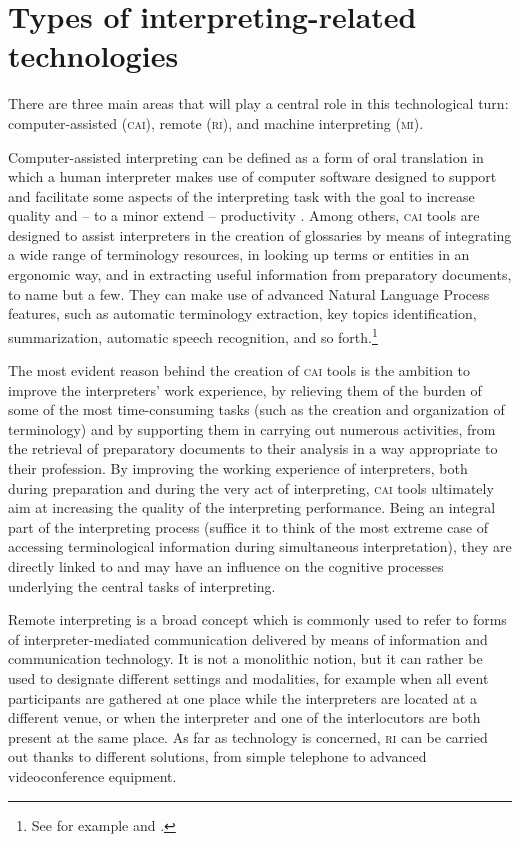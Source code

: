 \documentclass[output=paper]{langsci/langscibook}
\begin{document}
\section{Types of interpreting-related technologies} 
There are three main areas that will play a central role in this technological turn: computer-assisted (\textsc{cai}), remote (\textsc{ri}), and machine interpreting (\textsc{mi}). 
 
Computer-assisted interpreting can be defined as a form of oral translation in which a human interpreter makes use of computer software designed to support and facilitate some aspects of the interpreting task with the goal to increase quality and -- to a minor extend -- productivity \citep{Fantinuoli2018}. Among others, \textsc{cai} tools are designed to assist interpreters in the creation of glossaries by means of integrating a wide range of terminology resources, in looking up terms or entities in an ergonomic way, and in extracting useful information from preparatory documents, to name but a few. They can make use of advanced Natural Language Process features, such as automatic terminology extraction, key topics identification, summarization, automatic speech recognition, and so forth.\footnote{See for example
\citet{Fantinuoli2017b}
and \citet{stewart_automatic_2018}.} 
 
The most evident reason behind the creation of \textsc{cai} tools is the ambition to improve the interpreters’ work experience, by relieving them of the burden of some of the most time-consuming tasks (such as the creation and organization of terminology) and by supporting them in carrying out numerous activities, from the retrieval of preparatory documents to their analysis in a way appropriate to their profession. By improving the working experience of interpreters, both during preparation and during the very act of interpreting, \textsc{cai} tools ultimately aim at increasing the quality of the interpreting performance. Being an integral part of the interpreting process (suffice it to think of the most extreme case of accessing terminological information during simultaneous interpretation), they are directly linked to and may have an influence on the cognitive processes underlying the central tasks of interpreting.   
 
Remote interpreting is a broad concept which is commonly used to refer to forms of interpreter-mediated communication delivered by means of information and communication technology. It is not a monolithic notion, but it can rather be used to designate different settings and modalities, for example when all event participants are gathered at one place while the interpreters are located at a different venue, or when the interpreter and one of the interlocutors are both present at the same place. As far as technology is concerned, \textsc{ri} can be carried out thanks to different solutions, from simple telephone to advanced videoconference equipment. 
 
\end{document}

